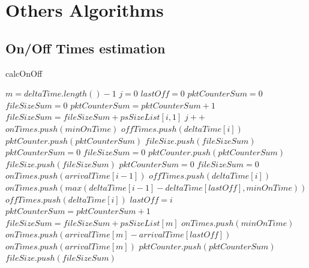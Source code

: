 








\section{Others Algorithms}

\subsection{On/Off Times estimation}

\begin{algorithm}
\caption{calcOnOff}
\begin{algorithmic}[1]
    \State $m = deltaTime.length() - 1$
    \State $j = 0$
    \State $lastOff = 0$
    \State $pktCounterSum = 0$
    \State $fileSizeSum = 0$
    	\State $pktCounterSum = pktCounterSum + 1$
		\State $fileSizeSum = fileSizeSum + psSizeList[i, 1]$
    	 
        	\State $j++$
            \State $onTimes.push(minOnTime)$
            \State $offTimes.push(deltaTime[i])$
            	\State $pktCounter.push(pktCounterSum)$
				\State $fileSize.push(fileSizeSum)$
				\State $pktCounterSum = 0$
				\State $fileSizeSum = 0$
            \Else {} 
            	\State $pktCounter.push(pktCounterSum)$
				\State $fileSize.push(fileSizeSum)$
				\State $pktCounterSum = 0$
				\State $fileSizeSum = 0$
                	\State $onTimes.push(arrivalTime[i - 1])$
					\State $offTimes.push(deltaTime[i])$
                \Else {} 
					\State  $onTimes.push(max(deltaTime[i-1] - deltaTime[lastOff], minOnTime))$ 
					\State  $offTimes.push(deltaTime[i])$
                \EndIf
                \State $lastOff = i$
            \EndIf        
    \EndFor
    \State $pktCounterSum = pktCounterSum + 1$
	\State $fileSizeSum = fileSizeSum + psSizeList[m]$
     
		\State $onTimes.push(minOnTime)$ %
	\Else {}
		\State $onTimes.push(arrivalTime[m] - arrivalTime[lastOff])$ 
		\Else 
		\State $onTimes.push(arrivalTime[m])$ 
		\EndIf
	\EndIf
    \State $pktCounter.push(pktCounterSum)$
	\State $fileSize.push(fileSizeSum)$
    \EndFunction
\end{algorithmic}
\end{algorithm}



